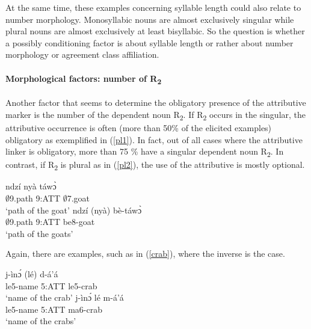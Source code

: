 \noindent At the same time, these examples concerning syllable length could also relate to number morphology. Monosyllabic nouns are almost exclusively singular while plural nouns are almost exclusively at least bisyllabic. So the question is whether a possibly conditioning factor is about syllable length or rather about number morphology or agreement class affiliation.

\paragraph{Morphological factors: number of R\textsubscript{2}} Another factor that seems to determine the obligatory presence of the attributive marker is the number of the dependent noun R\textsubscript{2}. If R\textsubscript{2} occurs in the singular, the attributive occurrence is often (more than 50\% of the elicited examples) obligatory as exemplified in (\ref{pl1}). In fact, out of all cases where the attributive linker is obligatory, more than 75 \% have a singular dependent noun R\textsubscript{2}. In contrast, if R\textsubscript{2} is plural as in (\ref{pl2}), the use of the attributive is mostly optional. 


\begin{exe}
\ex\label{pl}
\begin{xlist}
\ex \label{pl1}
  \gll     ndzí nyà táwɔ̀ \\
               $\emptyset$9.path 9:ATT $\emptyset$7.goat \\
    \trans `path of the goat'
\ex\label{pl2}
 \gll     ndzí (nyà) bè-táwɔ̀ \\
               $\emptyset$9.path 9:ATT be8-goat \\
    \trans `path of the goats'
\end {xlist}
\end{exe}

\noindent Again, there are examples, such as in (\ref{crab}), where the inverse is the case.

\begin{exe}
\ex\label{crab}
\begin{xlist}
\ex \label{crab1}
  \gll    j-ìnɔ́ (lé) d-á'á \\
               le5-name 5:ATT le5-crab \\
    \trans `name of the crab'
\ex\label{crab2}
 \gll     j-ìnɔ́ lé m-á'á \\
              le5-name 5:ATT ma6-crab \\
    \trans `name of the crabs'
\end {xlist}
\end{exe}


